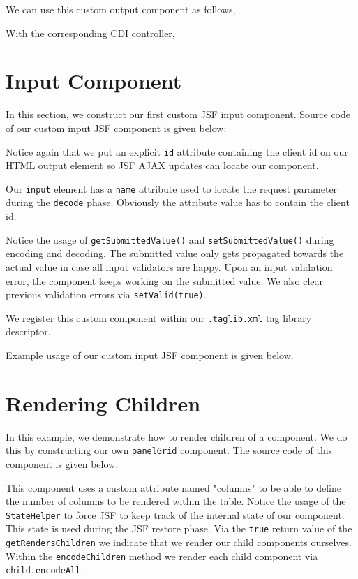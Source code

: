 We can use this custom output component as follows,


With the corresponding CDI controller,



\section{Input Component}
In this section, we construct our first custom JSF input component.
Source code of our custom input JSF component is given below:

Notice again that we put an explicit \texttt{id} attribute containing the client id on our HTML output element so JSF AJAX updates can locate our component.

Our \texttt{input} element has a \texttt{name} attribute used to locate the request parameter during the \texttt{decode} phase.
Obviously the attribute value has to contain the client id.

Notice the usage of \texttt{getSubmittedValue()} and \texttt{setSubmittedValue()} during encoding and decoding.
The submitted value only gets propagated towards the actual value in case all input validators are happy.
Upon an input validation error, the component keeps working on the submitted value.
We also clear previous validation errors via \texttt{setValid(true)}.

We register this custom component within our \texttt{.taglib.xml} tag library descriptor.


Example usage of our custom input JSF component is given below.


\section{Rendering Children}
In this example, we demonstrate how to render children of a component.
We do this by constructing our own \texttt{panelGrid} component.
The source code of this component is given below.

This component uses a custom attribute named "columns" to be able to define the number of columns to be rendered within the table.
Notice the usage of the \texttt{StateHelper} to force JSF to keep track of the internal state of our component.
This state is used during the JSF restore phase.
Via the \texttt{true} return value of the \texttt{getRendersChildren} we indicate that we render our child components ourselves.
Within the \texttt{encodeChildren} method we render each child component via \texttt{child.encodeAll}.

